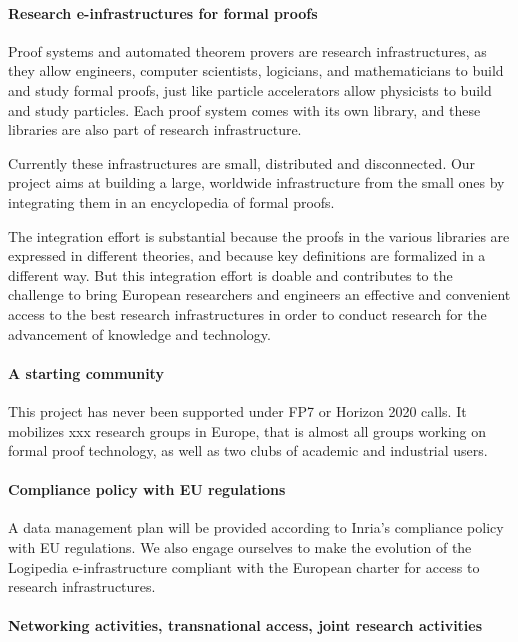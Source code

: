 \paragraph{Research e-infrastructures for formal proofs}

Proof systems and automated theorem provers are research
infrastructures, as they allow engineers, computer scientists, logicians, and
mathematicians to build and study formal proofs, just like particle
accelerators allow physicists to build and study particles. Each proof
system comes with its own library, and these libraries are also
part of research infrastructure.

Currently these infrastructures are small, distributed and
disconnected.  Our project aims at building a large, worldwide
infrastructure from the small ones by integrating them in an
encyclopedia of formal proofs.

The integration effort is substantial because the proofs in the
various libraries are expressed in different theories, and because
key definitions are formalized in a different way.
%
But this
integration effort is doable and contributes to the challenge to bring
European researchers and engineers an effective and convenient access
to the best research infrastructures in order to conduct research for
the advancement of knowledge and technology.

\paragraph{A starting community}

This project has never been supported under FP7 or Horizon 2020 calls.
It mobilizes xxx research groups in Europe, that is almost all groups
working on formal proof technology, as well as two clubs of academic
and industrial users.

\paragraph{Compliance policy with EU regulations}

A data management plan will be provided according to Inria’s
compliance policy with EU regulations. We also engage ourselves to
make the evolution of the {\sc Logipedia} e-infrastructure compliant
with the European charter for access to research infrastructures.

\paragraph{Networking activities, transnational access, joint research activities}

